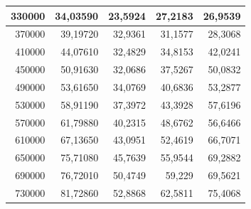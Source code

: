 \documentclass[a4paper, 12pt]{article}
\begin{document}
\begin{longtable}[c]{@{}rrrrr@{}}
	\multicolumn{1}{|r|}{330000}                  & \multicolumn{1}{r|}{34,03590}      & \multicolumn{1}{r|}{23,5924}       & \multicolumn{1}{r|}{27,2183}       & \multicolumn{1}{r|}{26,9539}       \\* \midrule
	\multicolumn{1}{|r|}{370000}                  & \multicolumn{1}{r|}{39,19720}      & \multicolumn{1}{r|}{32,9361}       & \multicolumn{1}{r|}{31,1577}       & \multicolumn{1}{r|}{28,3068}       \\* \midrule
	\multicolumn{1}{|r|}{410000}                  & \multicolumn{1}{r|}{44,07610}      & \multicolumn{1}{r|}{32,4829}       & \multicolumn{1}{r|}{34,8153}       & \multicolumn{1}{r|}{42,0241}       \\* \midrule
	\multicolumn{1}{|r|}{450000}                  & \multicolumn{1}{r|}{50,91630}      & \multicolumn{1}{r|}{32,0686}       & \multicolumn{1}{r|}{37,5267}       & \multicolumn{1}{r|}{50,0832}       \\* \midrule
	\multicolumn{1}{|r|}{490000}                  & \multicolumn{1}{r|}{53,61650}      & \multicolumn{1}{r|}{34,0769}       & \multicolumn{1}{r|}{40,6836}       & \multicolumn{1}{r|}{53,2877}       \\* \midrule
	\multicolumn{1}{|r|}{530000}                  & \multicolumn{1}{r|}{58,91190}      & \multicolumn{1}{r|}{37,3972}       & \multicolumn{1}{r|}{43,3928}       & \multicolumn{1}{r|}{57,6196}       \\* \midrule
	\multicolumn{1}{|r|}{570000}                  & \multicolumn{1}{r|}{61,79880}      & \multicolumn{1}{r|}{40,2315}       & \multicolumn{1}{r|}{48,6762}       & \multicolumn{1}{r|}{56,6466}       \\* \midrule
	\multicolumn{1}{|r|}{610000}                  & \multicolumn{1}{r|}{67,13650}      & \multicolumn{1}{r|}{43,0951}       & \multicolumn{1}{r|}{52,4619}       & \multicolumn{1}{r|}{66,7071}       \\* \midrule
	\multicolumn{1}{|r|}{650000}                  & \multicolumn{1}{r|}{75,71080}      & \multicolumn{1}{r|}{45,7639}       & \multicolumn{1}{r|}{55,9544}       & \multicolumn{1}{r|}{69,2882}       \\* \midrule
	\multicolumn{1}{|r|}{690000}                  & \multicolumn{1}{r|}{76,72010}      & \multicolumn{1}{r|}{50,4749}       & \multicolumn{1}{r|}{59,229}        & \multicolumn{1}{r|}{69,5621}       \\* \midrule
	\multicolumn{1}{|r|}{730000}                  & \multicolumn{1}{r|}{81,72860}      & \multicolumn{1}{r|}{52,8868}       & \multicolumn{1}{r|}{62,5811}       & \multicolumn{1}{r|}{75,4068}       \\* \midrule

\end{longtable}
\end{document}
